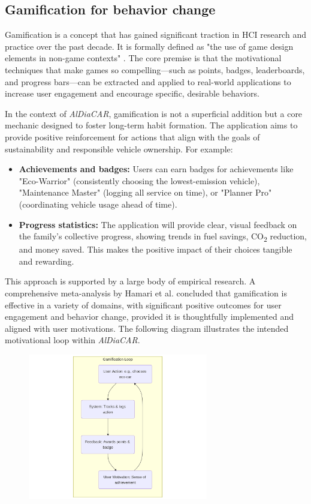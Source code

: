\subsection{Gamification for behavior change}
Gamification is a concept that has gained significant traction in HCI research and practice over the past decade. It is formally defined as "the use of game design elements in non-game contexts" \cite{deterding2011gamification}. The core premise is that the motivational techniques that make games so compelling—such as points, badges, leaderboards, and progress bars—can be extracted and applied to real-world applications to increase user engagement and encourage specific, desirable behaviors.

\textgap

In the context of \textit{AlDiaCAR}, gamification is not a superficial addition but a core mechanic designed to foster long-term habit formation. The application aims to provide positive reinforcement for actions that align with the goals of sustainability and responsible vehicle ownership. For example:
\begin{itemize}
    \item \textbf{Achievements and badges:} Users can earn badges for achievements like "Eco-Warrior" (consistently choosing the lowest-emission vehicle), "Maintenance Master" (logging all service on time), or "Planner Pro" (coordinating vehicle usage ahead of time).
    \item \textbf{Progress statistics:} The application will provide clear, visual feedback on the family's collective progress, showing trends in fuel savings, CO\textsubscript{2} reduction, and money saved. This makes the positive impact of their choices tangible and rewarding.
\end{itemize}

\textgap

This approach is supported by a large body of empirical research. A comprehensive meta-analysis by Hamari et al. \cite{hamari2014does} concluded that gamification is effective in a variety of domains, with significant positive outcomes for user engagement and behavior change, provided it is thoughtfully implemented and aligned with user motivations. The following diagram illustrates the intended motivational loop within \textit{AlDiaCAR}.

\begin{figure}[H]
    \centering
    \includegraphics[width=0.7\textwidth]{images/background/gamification-mermaid.png}
\end{figure}

